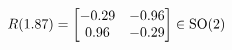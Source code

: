 \documentclass[preview]{standalone}
\begin{document}
\begin{align*}
\special{dvisvgm:raw <g id='unique000'>}R(1.87) = \begin{bmatrix} -0.29 & -0.96 \\ 0.96 & -0.29 \end{bmatrix} \in \text{SO}(2)\special{dvisvgm:raw </g>}
\end{align*}
\end{document}

